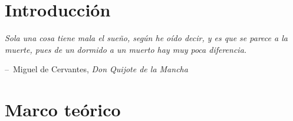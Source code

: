 \documentclass[12pt,letterpaper,titlepage,oneside,openright]{book}
\makeatletter
\newenvironment{chapquote}[2][2em]
  {\setlength{\@tempdima}{#1}%
   \def\chapquote@author{#2}%
   \parshape 1 \@tempdima \dimexpr\textwidth-2\@tempdima\relax%
   \itshape}
  {\par\normalfont\hfill--\ \chapquote@author\hspace*{\@tempdima}\par\bigskip}
\makeatother
\begin{document}
\newpage

\tableofcontents

\newpage

\mainmatter

\chapter{Introducción}

\begin{chapquote}{Miguel de Cervantes, \textit{Don Quijote de la Mancha}}
Sola una cosa tiene mala el sueño, según he oído decir, y es que se parece a la muerte, pues de un dormido a un muerto hay muy poca diferencia.
\end{chapquote}

\lipsum[1-2]

\chapter{Marco teórico}

\lipsum[1-2]
\end{document}
